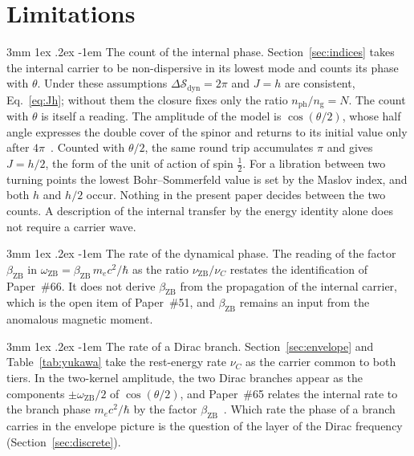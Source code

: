 \documentclass[%
 reprint, amsmath,amssymb, aps, prb, ]{revtex4-2}
\makeatletter
\numberwithin{equation}{section}
\renewcommand\paragraph{%
  \@startsection{paragraph}{4}{\z@}%
    {3mm \@plus 1ex \@minus .2ex}%
    {-1em}%
    {\normalfont\normalsize\itshape}}
\newcommand{\iphase}{\theta}  %
\newcommand{\omZB}{\omega_{\text{ZB}}}
\newcommand{\bZB}{\beta_{\mathrm{ZB}}}
\newcommand{\Sdyn}{\mathcal{S}_{\mathrm{dyn}}}
\newcommand{\nph}{n_{\mathrm{ph}}}
\newcommand{\ngr}{n_{\mathrm{g}}}
\makeatother
\begin{document}
\section{Limitations}
\label{sec:limits}

\paragraph{The count of the internal phase.} Section~\ref{sec:indices} takes the internal carrier to be non-dispersive in its lowest mode and counts its phase with $\iphase$. Under these assumptions $\Delta\Sdyn = 2\pi$ and $J = h$ are consistent, Eq.~\eqref{eq:Jh}; without them the closure fixes only the ratio $\nph/\ngr = N$. The count with $\iphase$ is itself a reading. The amplitude of the model is $\cos(\iphase/2)$, whose half angle expresses the double cover of the spinor and returns to its initial value only after $4\pi$~\cite{H65, H29}. Counted with $\iphase/2$, the same round trip accumulates $\pi$ and gives $J = h/2$, the form of the unit of action of spin $\tfrac12$. For a libration between two turning points the lowest Bohr--Sommerfeld value is set by the Maslov index, and both $h$ and $h/2$ occur. Nothing in the present paper decides between the two counts. A description of the internal transfer by the energy identity alone does not require a carrier wave.

\paragraph{The rate of the dynamical phase.} The reading of the factor $\bZB$ in $\omZB = \bZB\,m_ec^2/\hbar$ as the ratio $\nu_{\mathrm{ZB}}/\nu_C$ restates the identification of Paper~\#66. It does not derive $\bZB$ from the propagation of the internal carrier, which is the open item of Paper~\#51, and $\bZB$ remains an input from the anomalous magnetic moment.

\paragraph{The rate of a Dirac branch.} Section~\ref{sec:envelope} and Table~\ref{tab:yukawa} take the rest-energy rate $\nu_C$ as the carrier common to both tiers. In the two-kernel amplitude, the two Dirac branches appear as the components $\pm\omZB/2$ of $\cos(\iphase/2)$, and Paper~\#65 relates the internal rate to the branch phase $m_ec^2/\hbar$ by the factor $\bZB$~\cite{H65}. Which rate the phase of a branch carries in the envelope picture is the question of the layer of the Dirac frequency (Section~\ref{sec:discrete}).
\end{document}

